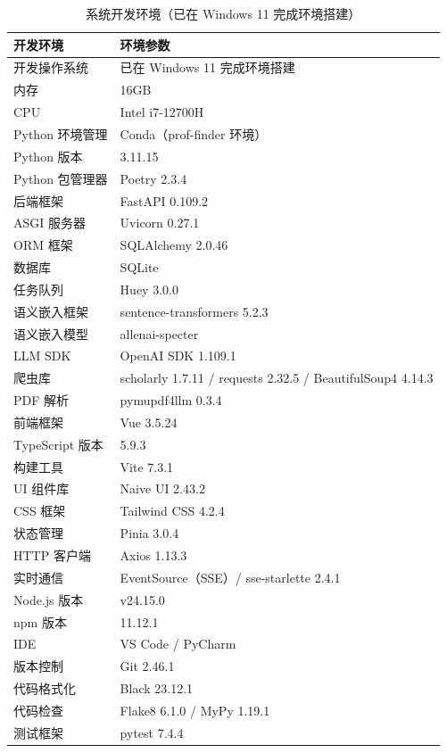 \documentclass[11pt]{article}
\begin{document}
\begin{table}[htbp]
  \centering
  \caption{系统开发环境（已在 Windows 11 完成环境搭建）}
  \begin{tabular}{ll}
    \toprule
    开发环境 & 环境参数 \\
    \midrule
    开发操作系统 & 已在 Windows 11 完成环境搭建 \\
    内存 & 16GB \\
    CPU & Intel i7-12700H \\
    Python 环境管理 & Conda（prof-finder 环境） \\
    Python 版本 & 3.11.15 \\
    Python 包管理器 & Poetry 2.3.4 \\
    后端框架 & FastAPI 0.109.2 \\
    ASGI 服务器 & Uvicorn 0.27.1 \\
    ORM 框架 & SQLAlchemy 2.0.46 \\
    数据库 & SQLite \\
    任务队列 & Huey 3.0.0 \\
    语义嵌入框架 & sentence-transformers 5.2.3 \\
    语义嵌入模型 & allenai-specter \\
    LLM SDK & OpenAI SDK 1.109.1 \\
    爬虫库 & scholarly 1.7.11 / requests 2.32.5 / BeautifulSoup4 4.14.3 \\
    PDF 解析 & pymupdf4llm 0.3.4 \\
    前端框架 & Vue 3.5.24 \\
    TypeScript 版本 & 5.9.3 \\
    构建工具 & Vite 7.3.1 \\
    UI 组件库 & Naive UI 2.43.2 \\
    CSS 框架 & Tailwind CSS 4.2.4 \\
    状态管理 & Pinia 3.0.4 \\
    HTTP 客户端 & Axios 1.13.3 \\
    实时通信 & EventSource（SSE）/ sse-starlette 2.4.1 \\
    Node.js 版本 & v24.15.0 \\
    npm 版本 & 11.12.1 \\
    IDE & VS Code / PyCharm \\
    版本控制 & Git 2.46.1 \\
    代码格式化 & Black 23.12.1 \\
    代码检查 & Flake8 6.1.0 / MyPy 1.19.1 \\
    测试框架 & pytest 7.4.4 \\
    \bottomrule
  \end{tabular}
  \label{tab:dev_env_windows}
\end{table}
\end{document}

